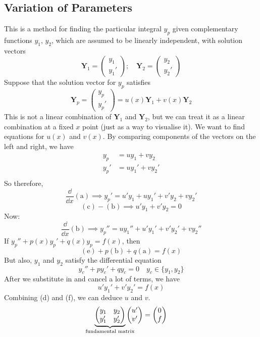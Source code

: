 \documentclass{article}
\begin{document}
	\subsection{Variation of Parameters}
	This is a method for finding the particular integral $y_p$ given complementary functions $y_1$, $y_2$, which are assumed to be linearly independent, with solution vectors
	\[ \bm Y_1 = \begin{pmatrix}
		y_1 \\ y_1'
	\end{pmatrix};\quad \bm Y_2 = \begin{pmatrix}
		y_2 \\ y_2'
	\end{pmatrix} \]
	Suppose that the solution vector for $y_p$ satisfies
	\begin{equation}\label{varparam1}
		\bm Y_p = \begin{pmatrix}
			y_p \\ y_p'
		\end{pmatrix} = u(x)\bm Y_1 + v(x)\bm Y_2
	\end{equation}
	This is not a linear combination of $\bm Y_1$ and $\bm Y_2$, but we can treat it as a linear combination at a fixed $x$ point (just as a way to visualise it). We want to find equations for $u(x)$ and $v(x)$. By comparing components of the vectors on the left and right, we have
	\begin{align*}
		y_p &= uy_1 + vy_2 \tag{a}\\
		y_p' &= uy_1' + vy_2' \tag{b}\\
	\end{align*}
	So therefore,
	\[ \frac{\dd}{\dd x}(\mathrm a) \implies y_p' = u'y_1 + uy_1' + v'y_2 + vy_2' \tag{c} \]
	\[ (\mathrm c) - (\mathrm b) \implies u'y_1 + v'y_2 = 0 \tag{d} \]
	Now:
	\[ \frac{\dd}{\dd x}(\mathrm b) \implies y_p'' = uy_1'' + u'y_1' + v'y_2' + vy_2'' \tag{e} \]
	If $y_p'' + p(x)y_p' + q(x)y_p = f(x)$, then
	\[ (\mathrm e) + p(\mathrm b) + q(\mathrm a) = f(x) \]
	But also, $y_1$ and $y_2$ satisfy the differential equation
	\[ y_c'' + py_c' + qy_c = 0\quad y_c \in \{ y_1, y_2 \} \]
	After we substitute in and cancel a lot of terms, we have
	\[ u'y_1' + v'y_2' = f(x) \tag{f} \]
	Combining (d) and (f), we can deduce $u$ and $v$.
	\[ \underbrace{\begin{pmatrix}
		y_1 & y_2 \\ y_1' & y_2'
	\end{pmatrix}}_{\mathclap{\text{fundamental matrix}}} \begin{pmatrix}
		u' \\ v'
	\end{pmatrix} = \begin{pmatrix}
		0 \\ f
	\end{pmatrix} \]
\end{document}
